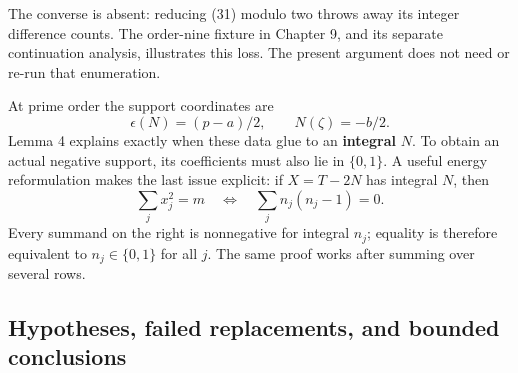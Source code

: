 \documentclass[
  11pt,
]{article}
\begin{document}
The converse is absent: reducing (31) modulo two throws away its integer
difference counts. The order-nine fixture in Chapter 9, and its separate
continuation analysis, illustrates this loss. The present argument does
not need or re-run that enumeration.

At prime order the support coordinates are \[
 \epsilon(N)=(p-a)/2,\qquad N(\zeta)=-b/2.                 \tag{37}
\] Lemma 4 explains exactly when these data glue to an \textbf{integral}
\(N\). To obtain an actual negative support, its coefficients must also
lie in \(\{0,1\}\). A useful energy reformulation makes the last issue
explicit: if \(X=T-2N\) has integral \(N\), then \[
 \sum_jx_j^2=m
 \quad\Longleftrightarrow\quad
 \sum_jn_j(n_j-1)=0.
 \] Every summand on the right is nonnegative for integral \(n_j\);
equality is therefore equivalent to \(n_j\in\{0,1\}\) for all \(j\). The
same proof works after summing over several rows.

\subsection{Hypotheses, failed replacements, and bounded
conclusions}\label{hypotheses-failed-replacements-and-bounded-conclusions}
\end{document}
